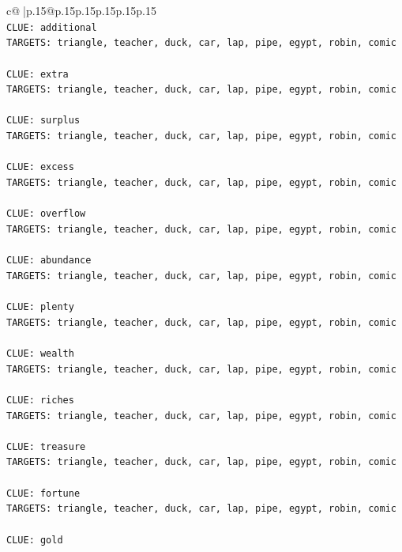 \documentclass{article}
\begin{document}
{\begin{supertabular}{c@{$\;$}|p{.15\linewidth}@{}p{.15\linewidth}p{.15\linewidth}p{.15\linewidth}p{.15\linewidth}p{.15\linewidth}}
{{{\\ 
\texttt{CLUE: additional} \\
\texttt{TARGETS: triangle, teacher, duck, car, lap, pipe, egypt, robin, comic} \\
\\ 
\texttt{CLUE: extra} \\
\texttt{TARGETS: triangle, teacher, duck, car, lap, pipe, egypt, robin, comic} \\
\\ 
\texttt{CLUE: surplus} \\
\texttt{TARGETS: triangle, teacher, duck, car, lap, pipe, egypt, robin, comic} \\
\\ 
\texttt{CLUE: excess} \\
\texttt{TARGETS: triangle, teacher, duck, car, lap, pipe, egypt, robin, comic} \\
\\ 
\texttt{CLUE: overflow} \\
\texttt{TARGETS: triangle, teacher, duck, car, lap, pipe, egypt, robin, comic} \\
\\ 
\texttt{CLUE: abundance} \\
\texttt{TARGETS: triangle, teacher, duck, car, lap, pipe, egypt, robin, comic} \\
\\ 
\texttt{CLUE: plenty} \\
\texttt{TARGETS: triangle, teacher, duck, car, lap, pipe, egypt, robin, comic} \\
\\ 
\texttt{CLUE: wealth} \\
\texttt{TARGETS: triangle, teacher, duck, car, lap, pipe, egypt, robin, comic} \\
\\ 
\texttt{CLUE: riches} \\
\texttt{TARGETS: triangle, teacher, duck, car, lap, pipe, egypt, robin, comic} \\
\\ 
\texttt{CLUE: treasure} \\
\texttt{TARGETS: triangle, teacher, duck, car, lap, pipe, egypt, robin, comic} \\
\\ 
\texttt{CLUE: fortune} \\
\texttt{TARGETS: triangle, teacher, duck, car, lap, pipe, egypt, robin, comic} \\
\\ 
\texttt{CLUE: gold} \\
}}}
\end{supertabular}}
\end{document}
